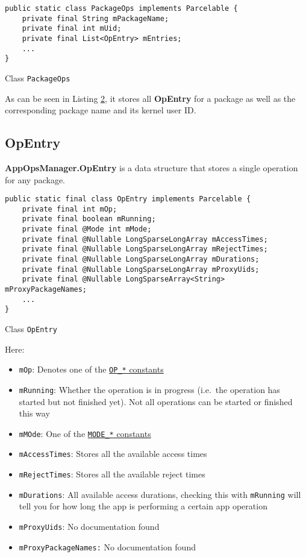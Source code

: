 \begin{listing}[H]
    \begin{verbatim}
public static class PackageOps implements Parcelable {
    private final String mPackageName;
    private final int mUid;
    private final List<OpEntry> mEntries;
    ...
}
    \end{verbatim}
    \caption{Class \texttt{PackageOps}}
    \label{lst:package-ops-class}
\end{listing}

As can be seen in Listing \hyperref[lst:package-ops-class]{2}, it stores all \textbf{OpEntry} for a package as well as the
corresponding package name and its kernel user ID\@.

\subsection{OpEntry}\label{subsec:opentry}
\textbf{AppOpsManager.OpEntry} is a data structure that stores a single operation for any package.

\begin{listing}[H]
    \begin{verbatim}
public static final class OpEntry implements Parcelable {
    private final int mOp;
    private final boolean mRunning;
    private final @Mode int mMode;
    private final @Nullable LongSparseLongArray mAccessTimes;
    private final @Nullable LongSparseLongArray mRejectTimes;
    private final @Nullable LongSparseLongArray mDurations;
    private final @Nullable LongSparseLongArray mProxyUids;
    private final @Nullable LongSparseArray<String> mProxyPackageNames;
    ...
}
    \end{verbatim}
    \caption{Class \texttt{OpEntry}}
    \label{lst:class-op-entry}
\end{listing}
Here:
\begin{itemize}
    \item \texttt{mOp}: Denotes one of the \hyperref[subsec:op-constants]{\texttt{OP\_*} constants}
    \item \texttt{mRunning}: Whether the operation is in progress (i.e.\ the operation has started but not finished
    yet). Not all operations can be started or finished this way
    \item \texttt{mMOde}: One of the \hyperref[subsec:mode-constants]{\texttt{MODE\_*} constants}
    \item \texttt{mAccessTimes}: Stores all the available access times
    \item \texttt{mRejectTimes}: Stores all the available reject times
    \item \texttt{mDurations}: All available access durations, checking this with \texttt{mRunning} will tell you for
    how long the app is performing a certain app operation
    \item \texttt{mProxyUids}: No documentation found
    \item \texttt{mProxyPackageNames:} No documentation found
\end{itemize}


